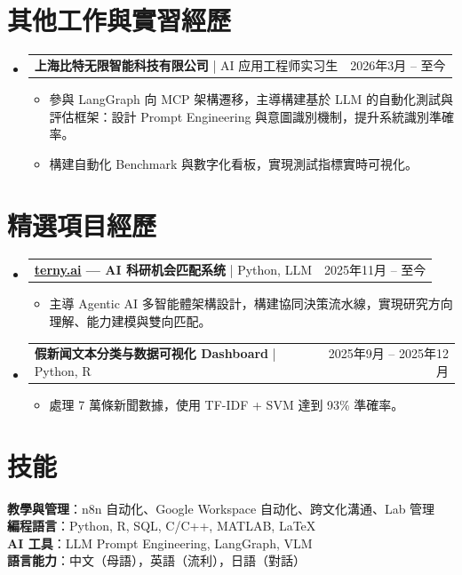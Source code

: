 \documentclass[UTF8,a4paper,10pt]{ctexart}
\makeatletter
\newcommand{\resumeItem}[1]{\item\small{\linespread{1.1}\selectfont #1\par}\vspace{-0.5pt}}
\newcommand{\resumeProjectHeading}[2]{%
  \item
  \begin{tabular*}{0.97\textwidth}{l@{\extracolsep{\fill}}r}
    \normalsize #1 & #2 \\
  \end{tabular*}\vspace{-4pt}
}
\newcommand{\resumeSubHeadingListStart}{\begin{itemize}[label={}, leftmargin=0.15in]}
\newcommand{\resumeSubHeadingListEnd}{\end{itemize}}
\newcommand{\resumeItemListStart}{\begin{itemize}[label=\tiny$\bullet$, itemsep=0pt, topsep=3pt, parsep=0pt]}
\newcommand{\resumeItemListEnd}{\end{itemize}\vspace{-6pt}}
\makeatother
\begin{document}
\section{其他工作與實習經歷}
\resumeSubHeadingListStart
  \resumeProjectHeading
    {\textbf{上海比特无限智能科技有限公司} \quad | \quad AI 应用工程师实习生}{2026年3月 -- 至今}
    \resumeItemListStart
      \resumeItem{參與 LangGraph 向 MCP 架構遷移，主導構建基於 LLM 的自動化測試與評估框架：設計 Prompt Engineering 與意圖識別機制，提升系統識別準確率。}
      \resumeItem{構建自動化 Benchmark 與數字化看板，實現測試指標實時可視化。}
    \resumeItemListEnd
\resumeSubHeadingListEnd

\section{精選項目經歷}
\resumeSubHeadingListStart
  \resumeProjectHeading
    {\textbf{\href{https://terny.ai/}{terny.ai} — AI 科研机会匹配系统} \quad | \quad Python, LLM}{2025年11月 -- 至今}
    \resumeItemListStart
      \resumeItem{主導 Agentic AI 多智能體架構設計，構建協同決策流水線，實現研究方向理解、能力建模與雙向匹配。}
    \resumeItemListEnd

  \resumeProjectHeading
    {\textbf{假新闻文本分类与数据可视化 Dashboard} \quad | \quad Python, R}{2025年9月 -- 2025年12月}
    \resumeItemListStart
      \resumeItem{處理 7 萬條新聞數據，使用 TF-IDF + SVM 達到 93\% 準確率。}
    \resumeItemListEnd
\resumeSubHeadingListEnd

\section{技能}
\vspace{2pt}
\small
\textbf{教學與管理}：n8n 自动化、Google Workspace 自动化、跨文化溝通、Lab 管理 \\
\textbf{編程語言}：Python, R, SQL, C/C++, MATLAB, LaTeX \\
\textbf{AI 工具}：LLM Prompt Engineering, LangGraph, VLM \\
\textbf{語言能力}：中文（母語），英語（流利），日語（對話）
\end{document}
